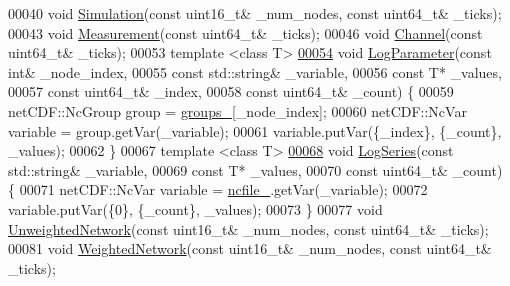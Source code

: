 \begin{DoxyCode}
00040   \textcolor{keywordtype}{void} \hyperlink{classosse_1_1collaborate_1_1_data_logger_a8ac81bf337fd501a4dd1cefd7943b863}{Simulation}(\textcolor{keyword}{const} uint16\_t& \_num\_nodes, \textcolor{keyword}{const} uint64\_t& \_ticks);
00043   \textcolor{keywordtype}{void} \hyperlink{classosse_1_1collaborate_1_1_data_logger_a4bd4ae8e64651aa52952ed1f758f51a7}{Measurement}(\textcolor{keyword}{const} uint64\_t& \_ticks);
00046   \textcolor{keywordtype}{void} \hyperlink{classosse_1_1collaborate_1_1_data_logger_a8a0d8ce2e134ad2f16850d3412cd68e2}{Channel}(\textcolor{keyword}{const} uint64\_t& \_ticks);
00053   \textcolor{keyword}{template} <\textcolor{keyword}{class} T>
\hyperlink{classosse_1_1collaborate_1_1_data_logger_a2aa58d2cca89973b14894ad93b5ebb12}{00054}   \textcolor{keywordtype}{void} \hyperlink{classosse_1_1collaborate_1_1_data_logger_a2aa58d2cca89973b14894ad93b5ebb12}{LogParameter}(\textcolor{keyword}{const} \textcolor{keywordtype}{int}& \_node\_index,
00055                     \textcolor{keyword}{const} std::string& \_variable,
00056                     \textcolor{keyword}{const} T* \_values,
00057                     \textcolor{keyword}{const} uint64\_t& \_index,
00058                     \textcolor{keyword}{const} uint64\_t& \_count) \{
00059     netCDF::NcGroup group = \hyperlink{classosse_1_1collaborate_1_1_data_logger_aba3561b8bf7fde66ba88062a3d96a5de}{groups\_}[\_node\_index];
00060     netCDF::NcVar variable = group.getVar(\_variable);
00061     variable.putVar(\{\_index\}, \{\_count\}, \_values);
00062   \}
00067   \textcolor{keyword}{template} <\textcolor{keyword}{class} T>
\hyperlink{classosse_1_1collaborate_1_1_data_logger_a40510224c3d75bb5d40fe68a3b9a278c}{00068}   \textcolor{keywordtype}{void} \hyperlink{classosse_1_1collaborate_1_1_data_logger_a40510224c3d75bb5d40fe68a3b9a278c}{LogSeries}(\textcolor{keyword}{const} std::string& \_variable,
00069                  \textcolor{keyword}{const} T* \_values,
00070                  \textcolor{keyword}{const} uint64\_t& \_count) \{
00071     netCDF::NcVar variable = \hyperlink{classosse_1_1collaborate_1_1_data_logger_ad24528379ccc57084cdc857c69744e37}{ncfile\_}.getVar(\_variable);
00072     variable.putVar(\{0\}, \{\_count\}, \_values);
00073   \}
00077   \textcolor{keywordtype}{void} \hyperlink{classosse_1_1collaborate_1_1_data_logger_a5c69d3fc5aa12053eebc1b5406f8bf6a}{UnweightedNetwork}(\textcolor{keyword}{const} uint16\_t& \_num\_nodes, \textcolor{keyword}{const} uint64\_t& \_ticks);
00081   \textcolor{keywordtype}{void} \hyperlink{classosse_1_1collaborate_1_1_data_logger_ac056c731698a952e787e79a6cbb6129f}{WeightedNetwork}(\textcolor{keyword}{const} uint16\_t& \_num\_nodes, \textcolor{keyword}{const} uint64\_t& \_ticks);

\end{DoxyCode}
